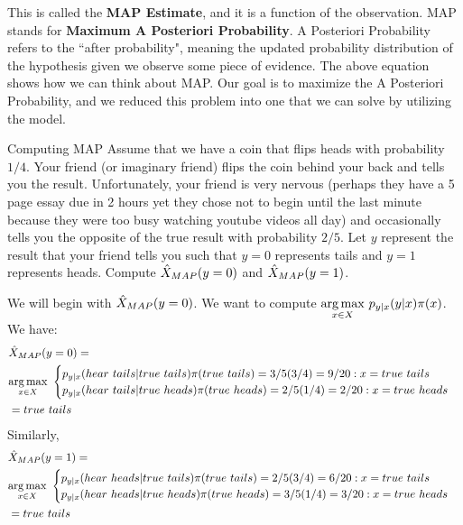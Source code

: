 This is called the \textbf{MAP Estimate}, and it is a function of the observation. MAP stands for \textbf{Maximum A Posteriori Probability}. A Posteriori Probability refers to the ``after probability", meaning the 
updated probability distribution of the hypothesis given we observe some piece of evidence. The above equation shows how we can think about MAP. Our goal is to maximize the A Posteriori Probability, and we reduced this problem into one that we can solve by utilizing the model. \newline 

\begin{exmp}{Computing MAP}{}
Assume that we have a coin that flips heads with probability \(1/4\). Your friend (or imaginary friend) flips the coin behind your back and tells you the result. Unfortunately, your friend is very nervous (perhaps they have a 5 page essay due in 2 hours yet they chose not to begin until the last minute because they were too busy watching youtube videos all day) and occasionally tells you the opposite of the true result with probability \(2/5\). Let \(y\) represent the result that your friend tells you such that \(y=0\) represents tails and \(y=1\) represents heads. Compute \({\hat{X}_{MAP}} (y=0)\) and \({\hat{X}_{MAP}} (y=1)\). \newline 

We will begin with \({\hat{X}_{MAP}} (y=0)\). We want to compute \(\underset{x\in X}{\argmax}\ p_{y|x}(y|x)\pi(x)\). We have: 
\begin{align*}
  &\MAP (y=0) = \\
  &\underset{x\in X}{\argmax}\ 
\begin{cases}
	p_{y|x}(hear\ tails|true\ tails)\pi(true\ tails) = 3/5(3/4)=9/20:x=true \ tails \\
	p_{y|x}(hear\ tails|true\ heads)\pi(true\ heads) = 2/5(1/4) = 2/20:x=true\ heads
\end{cases} 
\\
&= true \ tails
\end{align*}
Similarly,
\begin{align*}
  &\MAP (y=1) = \\
  &\underset{x\in X}{\argmax}\ 
\begin{cases}
	p_{y|x}(hear\ heads|true\ tails)\pi(true\ tails) = 2/5(3/4)=6/20:x=true \ tails \\
	p_{y|x}(hear\ heads|true\ heads)\pi(true\ heads) = 3/5(1/4) = 3/20:x=true\ heads
\end{cases} 
\\
&= true \ tails
\end{align*}
\newline 


\end{exmp}
